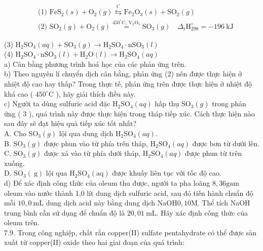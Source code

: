 \documentclass[10pt]{article}
\begin{document}
$$
\begin{aligned}
& \text { (1) } \mathrm{FeS}_{2}(s)+\mathrm{O}_{2}(g) \stackrel{\mathrm{t}^{\circ}}{\leftrightarrows} \mathrm{Fe}_{2} \mathrm{O}_{3}(s)+\mathrm{SO}_{2}(g) \\
& \text { (2) } \mathrm{SO}_{2}(g)+\mathrm{O}_{2}(g) \stackrel{450^{\circ} \mathrm{C}, \mathrm{~V}_{2} \mathrm{O}_{5}}{=} \mathrm{SO}_{3}(g) \quad \Delta_{\mathrm{r}} \mathrm{H}_{298}^{\circ}=-196 \mathrm{~kJ}
\end{aligned}
$$

(3) $\mathrm{H}_{2} \mathrm{SO}_{4}(a q)+\mathrm{SO}_{3}(g) \rightarrow \mathrm{H}_{2} \mathrm{SO}_{4} \cdot \mathrm{nSO}_{3}(l)$\\
(4) $\mathrm{H}_{2} \mathrm{SO}_{4} \cdot \mathrm{nSO}_{3}(l)+\mathrm{H}_{2} \mathrm{O}(l) \rightarrow \mathrm{H}_{2} \mathrm{SO}_{4}(a q)$\\
a) Cân bằng phương trình hoá học của các phản ứng trên.\\
b) Theo nguyên lí chuyển dịch cân bằng, phản ứng (2) nên được thực hiện ở nhiệt độ cao hay thấp? Trong thực tế, phản ứng trên được thực hiện ở nhiệt độ khá cao ( $450^{\circ} \mathrm{C}$ ), hãy giải thích điều này.\\
c) Người ta dùng sulfuric acid đặc $\mathrm{H}_{2} \mathrm{SO}_{4}(a q)$ hấp thụ $\mathrm{SO}_{3}(g)$ trong phản ứng ( 3 ), quá trình này được thực hiện trong tháp tiếp xúc. Cách thực hiện nào sau đây sẽ đạt hiệu quả tiếp xúc tốt nhất?\\
A. Cho $\mathrm{SO}_{3}(g)$ lội qua dung dịch $\mathrm{H}_{2} \mathrm{SO}_{4}(a q)$.\\
B. $\mathrm{SO}_{3}(g)$ được phun vào từ phía trên tháp, $\mathrm{H}_{2} \mathrm{SO}_{4}(a q)$ được bơn từ dưới lên.\\
C. $\mathrm{SO}_{3}(g)$ được xả vào từ phía dưới tháp, $\mathrm{H}_{2} \mathrm{SO}_{4}(a q)$ được phun từ trên xuống.\\
D. $\mathrm{SO}_{3}(\mathrm{~g})$ lội qua $\mathrm{H}_{2} \mathrm{SO}_{4}(\mathrm{aq})$ được khuấy liên tục với tốc độ cao.\\
d) Để xác định công thức của oleum thu được, người ta pha loãng $8,36 \mathrm{gam}$ oleum vào nước thành 1,0 lít dung dịch sulfuric acid, sau đó tiến hành chuẩn độ mỗi $10,0 \mathrm{~mL}$ dung dịch acid này bằng dung dịch $\mathrm{NaOH} 0,10 \mathrm{M}$. Thể tích NaOH trung bình cần sử dụng để chuẩn độ là $20,01 \mathrm{~mL}$. Hãy xác định công thức của oleum trên.\\
7.9. Trong công nghiệp, chất rắn copper(II) sulfate pentahydrate có thể được sản xuất từ copper(II) oxide theo hai giai đoạn của quá trình:
\end{document}
